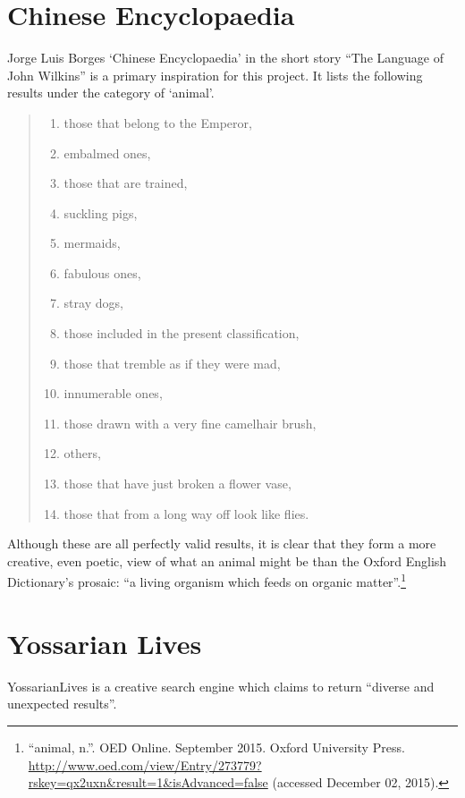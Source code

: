 \section{Chinese Encyclopaedia}

Jorge Luis Borges `Chinese Encyclopaedia' in the short story ``The Language of John Wilkins'' \autocite{Borges2000} is a primary inspiration for this project. It lists the following results under the category of `animal'.

\begin{quote}
\begin{enumerate}
  \item those that belong to the Emperor,
  \item embalmed ones,
  \item those that are trained,
  \item suckling pigs,
  \item mermaids,
  \item fabulous ones,
  \item stray dogs,
  \item those included in the present classification,
  \item those that tremble as if they were mad,
  \item innumerable ones,
  \item those drawn with a very fine camelhair brush,
  \item others,
  \item those that have just broken a flower vase,
  \item those that from a long way off look like flies.
\end{enumerate}
\end{quote}

Although these are all perfectly valid results, it is clear that they form a more creative, even poetic, view of what an animal might be than the Oxford English Dictionary's prosaic: ``a living organism which feeds on organic matter''.\footnote{``animal, n.''. OED Online. September 2015. Oxford University Press. \url{http://www.oed.com/view/Entry/273779?rskey=qx2uxn&result=1&isAdvanced=false} (accessed December 02, 2015).}


\section{Yossarian Lives}

YossarianLives is a creative search engine which claims to return ``diverse and unexpected results''.\autocite{Yossarian2015}

